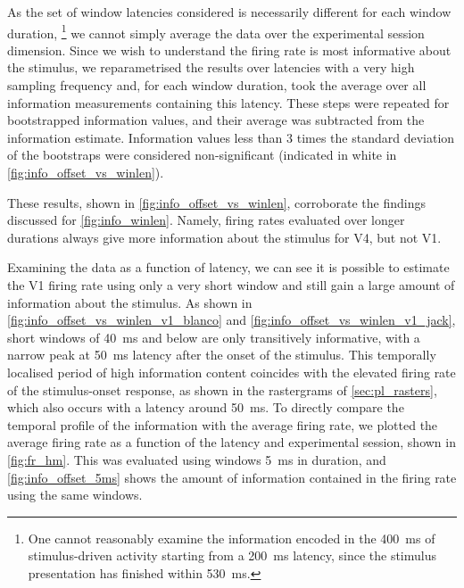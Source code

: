As the set of window latencies considered is necessarily different for each window duration,%
\footnote{
One cannot reasonably examine the information encoded in the \SI{400}{\milli\second} of stimulus-driven activity starting from a \SI{200}{\milli\second} latency, since the stimulus presentation has finished within \SI{530}{\milli\second}.
}
we cannot simply average the data over the experimental session dimension.
Since we wish to understand  the firing rate is most informative about the stimulus, we reparametrised the results over latencies with a very high sampling frequency and, for each window duration, took the average over all information measurements containing this latency.
These steps were repeated for bootstrapped information values, and their average was subtracted from the information estimate.
Information values less than \num{3} times the standard deviation of the bootstraps were considered non-significant (indicated in white in \autoref{fig:info_offset_vs_winlen}).

These results, shown in \autoref{fig:info_offset_vs_winlen}, corroborate the findings discussed for \autoref{fig:info_winlen}.
Namely, firing rates evaluated over longer durations always give more information about the stimulus for \ac{V4}, but not \ac{V1}.

Examining the data as a function of latency, we can see  it is possible to estimate the \ac{V1} firing rate using only a very short window and still gain a large amount of information about the stimulus.
As shown in \autoref{fig:info_offset_vs_winlen_v1_blanco} and \autoref{fig:info_offset_vs_winlen_v1_jack}, short windows of \SI{40}{\milli\second} and below are only transitively informative, with a narrow peak at \SI{50}{\milli\second} latency after the onset of the stimulus.
This temporally localised period of high information content coincides with the elevated firing rate of the stimulus-onset response, as shown in the rastergrams of \autoref{sec:pl_rasters}, which also occurs with a latency around \SI{50}{\milli\second}.
To directly compare the temporal profile of the information with the average firing rate, we plotted the average firing rate as a function of the latency and experimental session, shown in \autoref{fig:fr_hm}.
This was evaluated using windows \SI{5}{\milli\second} in duration, and \autoref{fig:info_offset_5ms} shows the amount of information contained in the firing rate using the same windows.


